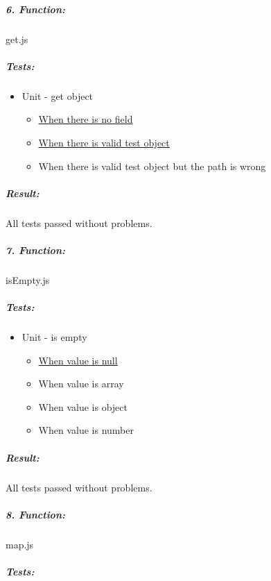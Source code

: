 \documentclass[a4paper, 12pt]{article}
\begin{document}
		\hypertarget{header-n202}{%
		\subparagraph{6. Function:}\label{header-n202}}
		
		get.js
		
		\hypertarget{header-n204}{%
		\subparagraph{Tests:}\label{header-n204}}
		
		\begin{itemize}
		\item
		Unit - get object
		
		\begin{itemize}
			\item
			\underline{When there is no field}
			\item
			\underline{When there is valid test object}
			\item
			When there is valid test object but the path is wrong
		\end{itemize}
		\end{itemize}
		
		\hypertarget{header-n218}{%
		\subparagraph{Result:}\label{header-n218}}
		
		All tests passed without problems.



		\hypertarget{header-n247}{%
		\subparagraph{7. Function:}\label{header-n247}}
		
		isEmpty.js
		
		\hypertarget{header-n249}{%
		\subparagraph{Tests:}\label{header-n249}}
		
		\begin{itemize}
		\item
		Unit - is empty
		
		\begin{itemize}
			\item
			\underline{When value is null}
			\item
			When value is array
			\item
			When value is object
			\item
			When value is number
		\end{itemize}
		\end{itemize}
		
		\hypertarget{header-n260}{%
		\subparagraph{Result:}\label{header-n260}}
		
		All tests passed without problems.



		\hypertarget{header-n288}{%
		\subparagraph{8. Function:}\label{header-n288}}
		
		map.js
		
		\hypertarget{header-n290}{%
		\subparagraph{Tests:}\label{header-n290}}
		
\end{document}
